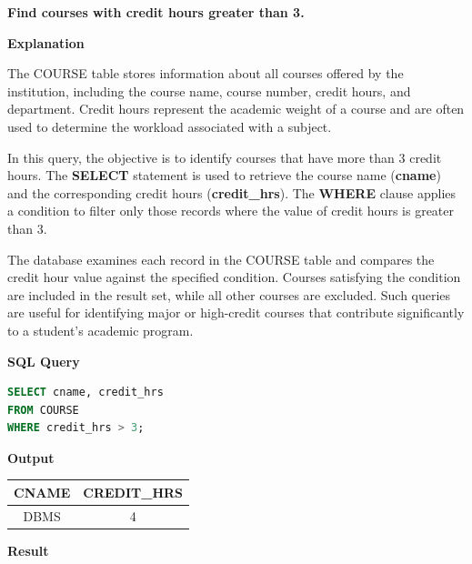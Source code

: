 \documentclass[12pt,a4paper]{report}
\begin{document}
\textbf{Find courses with credit hours greater than 3.}

\vspace{0.4cm}

\textbf{Explanation}

The COURSE table stores information about all courses offered by the institution, including the course name, course number, credit hours, and department. Credit hours represent the academic weight of a course and are often used to determine the workload associated with a subject.

In this query, the objective is to identify courses that have more than 3 credit hours. The \textbf{SELECT} statement is used to retrieve the course name (\textbf{cname}) and the corresponding credit hours (\textbf{credit\_hrs}). The \textbf{WHERE} clause applies a condition to filter only those records where the value of credit hours is greater than 3.

The database examines each record in the COURSE table and compares the credit hour value against the specified condition. Courses satisfying the condition are included in the result set, while all other courses are excluded. Such queries are useful for identifying major or high-credit courses that contribute significantly to a student's academic program.

\vspace{0.4cm}

\textbf{SQL Query}

\begin{lstlisting}[language=SQL]
SELECT cname, credit_hrs
FROM COURSE
WHERE credit_hrs > 3;
\end{lstlisting}

\vspace{0.5cm}

\textbf{Output}

\vspace{0.3cm}

\begin{center}
\renewcommand{\arraystretch}{1.6}
\begin{tabular}{|c|c|}
\hline
\textbf{CNAME} & \textbf{CREDIT\_HRS} \\
\hline
DBMS & 4 \\
\hline
\end{tabular}
\end{center}

\vspace{0.6cm}

\textbf{Result}
\end{document}
